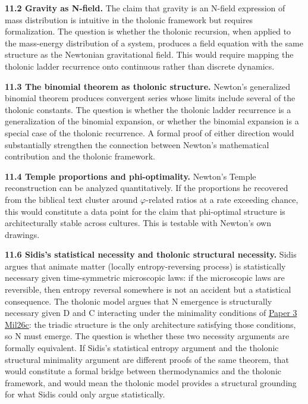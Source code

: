 \documentclass[12pt]{article}
\begin{document}
\textbf{11.2 Gravity as N-field.} The claim that gravity is an N-field
expression of mass distribution is intuitive in the tholonic framework
but requires formalization. The question is whether the tholonic
recursion, when applied to the mass-energy distribution of a system,
produces a field equation with the same structure as the Newtonian
gravitational field. This would require mapping the tholonic ladder
recurrence onto continuous rather than discrete dynamics.

\textbf{11.3 The binomial theorem as tholonic structure.} Newton's
generalized binomial theorem produces convergent series whose limits
include several of the tholonic constants. The question is whether the
tholonic ladder recurrence is a generalization of the binomial
expansion, or whether the binomial expansion is a special case of the
tholonic recurrence. A formal proof of either direction would
substantially strengthen the connection between Newton's mathematical
contribution and the tholonic framework.

\textbf{11.4 Temple proportions and phi-optimality.} Newton's Temple
reconstruction can be analyzed quantitatively. If the proportions he
recovered from the biblical text cluster around \(\varphi\)-related
ratios at a rate exceeding chance, this would constitute a data point
for the claim that phi-optimal structure is architecturally stable
across cultures. This is testable with Newton's own drawings.

\textbf{11.6 Sidis's statistical necessity and tholonic structural
necessity.} Sidis argues that animate matter (locally entropy-reversing
process) is statistically necessary given time-symmetric microscopic
laws: if the microscopic laws are reversible, then entropy reversal
somewhere is not an accident but a statistical consequence. The tholonic
model argues that N emergence is structurally necessary given D and C
interacting under the minimality conditions of
\href{https://github.com/baardev/truevalue/blob/main/docnav/Research/papers/3_minimal-recursive-triadic-framework/3_minimal-recursive-triadic-framework.pdf}{Paper
3}
\href{https://github.com/baardev/truevalue/blob/main/docnav/Research/papers/3_minimal-recursive-triadic-framework/3_minimal-recursive-triadic-framework.pdf}{Mil26c}:
the triadic structure is the only architecture satisfying those
conditions, so N must emerge. The question is whether these two
necessity arguments are formally equivalent. If Sidis's statistical
entropy argument and the tholonic structural minimality argument are
different proofs of the same theorem, that would constitute a formal
bridge between thermodynamics and the tholonic framework, and would mean
the tholonic model provides a structural grounding for what Sidis could
only argue statistically.
\end{document}
